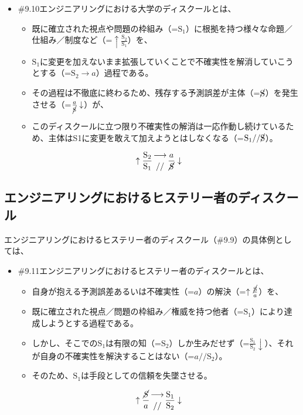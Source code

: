 \begin{note}{}
  \begin{itemize}
    \tightlist
    \item{\#9.10}エンジニアリングにおける大学のディスクールとは、
      \begin{itemize}
        \tightlist
        \item 既に確立された視点や問題の枠組み（=$\textrm{S}_1$）に根拠を持つ様々な命題／仕組み／制度など（=$\uparrow\frac{\textrm{S}_2}{\textrm{S}_1}$）を、
        \item $\textrm{S}_1$に変更を加えないまま拡張していくことで不確実性を解消していこうとする（=$\textrm{S}_2\rightarrow a$）過程である。
        \item その過程は不徹底に終わるため、残存する予測誤差が主体（=$\cancel{\textrm{S}}$）を発生させる（=$\frac{a}{\cancel{\textrm{S}}}\downarrow$）が、
        \item このディスクールに立つ限り不確実性の解消は一応作動し続けているため、主体はS1に変更を敢えて加えようとはしなくなる（=$\textrm{S}_1//\cancel{\textrm{S}}$）。
      \end{itemize}

$$
\uparrow\frac{\mathrm{S_2}}{\mathrm{S_1}}\genfrac{}{}{0pt}{}{\longrightarrow}{//}\frac{a}{\mathrm{\cancel{S}}}\downarrow
$$
  \end{itemize}
\end{note}

\subsection{エンジニアリングにおけるヒステリー者のディスクール}\label{ux30a8ux30f3ux30b8ux30cbux30a2ux30eaux30f3ux30b0ux306bux304aux3051ux308bux30d2ux30b9ux30c6ux30eaux30fcux8005ux306eux30c7ux30a3ux30b9ux30afux30fcux30eb}

エンジニアリングにおけるヒステリー者のディスクール（\#9.9）の具体例としては、

\begin{note}{}
  \begin{itemize}
    \tightlist
    \item{\#9.11}エンジニアリングにおけるヒステリー者のディスクールとは、
      \begin{itemize}
        \tightlist
        \item 自身が抱える予測誤差あるいは不確実性（=$a$）の解決（=$\uparrow\frac{\cancel{\textrm{S}}}{a}$）を、
        \item 既に確立された視点／問題の枠組み／権威を持つ他者（=$\textrm{S}_1$）により達成しようとする過程である。
        \item しかし、そこでの$\textrm{S}_1$は有限の知（=$\textrm{S}_2$）しか生みだせず（=$\frac{\textrm{S}_1}{\textrm{S}_2}\downarrow$）、それが自身の不確実性を解決することはない（=$a//\textrm{S}_2$）。
        \item そのため、$\textrm{S}_1$は手段としての信頼を失墜させる。
      \end{itemize}

$$
\uparrow\frac{\mathrm{\cancel{S}}}{a}\genfrac{}{}{0pt}{}{\longrightarrow}{//}\frac{\mathrm{S_1}}{\mathrm{S_2}}\downarrow
$$
  \end{itemize}
\end{note}

